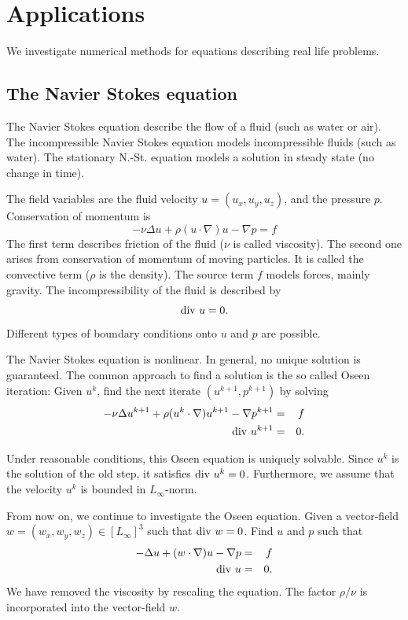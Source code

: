 \chapter{Applications}

We investigate numerical methods for equations describing real life problems.

\section{The Navier Stokes equation}

The Navier Stokes equation describe the flow of a fluid (such as water or air).
The incompressible Navier Stokes equation models incompressible fluids (such as water).
The stationary N.-St. equation models a solution in steady state (no change in time).

The field variables are the fluid velocity $u = (u_x, u_y, u_z)$, and the pressure $p$. 
Conservation of momentum is
$$
-\nu \Delta u + \rho (u \cdot \nabla) u - \nabla p = f
$$
The first term describes friction of the fluid ($\nu$ is called viscosity).
The second one arises from conservation of momentum of moving particles. 
It is called the convective term ($\rho$ is the density).
The source term $f$ models forces, mainly gravity.
The incompressibility of the fluid is described by
$$
\operatorname{div} \, u = 0.
$$
Different types of boundary conditions onto $u$ and $p$ are possible.

\bigskip

The Navier Stokes equation is nonlinear. In general, no unique solution is 
guaranteed. 
The common approach to find a solution is the so called Oseen iteration: Given $u^k$,
find the next iterate $(u^{k+1},p^{k+1})$ by solving
\begin{eqnarray*}
-\nu \Delta u^{k+1} + \rho (u^k \cdot \nabla) u^{k+1} - \nabla p^{k+1} & = & f \\
\operatorname{div} \, u^{k+1} & = & 0.
\end{eqnarray*}

Under reasonable conditions, this Oseen equation is uniquely solvable. Since $u^k$
is the solution of the old step, it satisfies $\operatorname{div} \,  u^k = 0$. Furthermore, we
assume that the velocity $u^k$ is bounded in $L_\infty$-norm.

\bigskip
From now on, we continue to investigate the Oseen equation. Given a vector-field
$w = (w_x, w_y, w_z) \in [L_\infty]^3$ such that $\operatorname{div} \, w = 0$. Find $u$ and $p$ 
such that
\begin{eqnarray*}
-\Delta u + (w \cdot \nabla) u - \nabla p & = & f \\
\operatorname{div} \, u & = & 0.
\end{eqnarray*}
We have removed the viscosity by rescaling the equation. The factor $\rho/\nu$ is
incorporated into the vector-field $w$.


